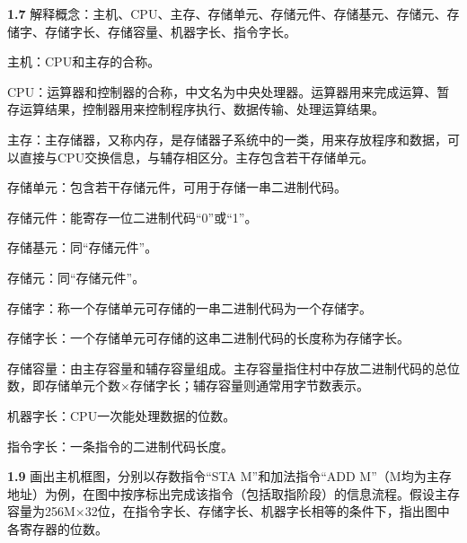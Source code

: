 \documentclass[UTF8]{report}
\newcommand{\problem}[1]{{\setlength{\parskip}{10pt}\noindent \bf{#1}}}
\newenvironment{solution}{{\noindent\hskip 2em \bf 解 \quad}}{}
\begin{document}

\maketitle




\problem{1.7} 解释概念：主机、CPU、主存、存储单元、存储元件、存储基元、存储元、存储字、存储字长、存储容量、机器字长、指令字长。

\begin{solution}
    
    主机：CPU和主存的合称。
    
    CPU：运算器和控制器的合称，中文名为中央处理器。运算器用来完成运算、暂存运算结果，控制器用来控制程序执行、数据传输、处理运算结果。
    
    主存：主存储器，又称内存，是存储器子系统中的一类，用来存放程序和数据，可以直接与CPU交换信息，与辅存相区分。主存包含若干存储单元。
    
    存储单元：包含若干存储元件，可用于存储一串二进制代码。
    
    存储元件：能寄存一位二进制代码“0”或“1”。
    
    存储基元：同“存储元件”。
    
    存储元：同“存储元件”。
    
    存储字：称一个存储单元可存储的一串二进制代码为一个存储字。
    
    存储字长：一个存储单元可存储的这串二进制代码的长度称为存储字长。
    
    存储容量：由主存容量和辅存容量组成。主存容量指住村中存放二进制代码的总位数，即存储单元个数×存储字长；辅存容量则通常用字节数表示。
    
    机器字长：CPU一次能处理数据的位数。
    
    指令字长：一条指令的二进制代码长度。

\end{solution}

\problem{1.9} 画出主机框图，分别以存数指令“STA M”和加法指令“ADD M”（M均为主存地址）为例，在图中按序标出完成该指令（包括取指阶段）的信息流程。假设主存容量为256M×32位，在指令字长、存储字长、机器字长相等的条件下，指出图中各寄存器的位数。
\end{document}
